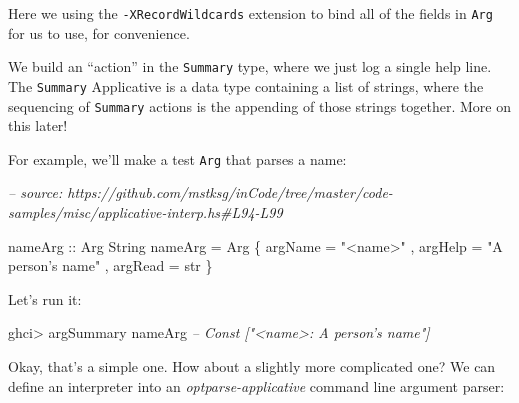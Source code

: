 \documentclass[]{article}
\newenvironment{Shaded}{}{}
\newcommand{\CommentTok}[1]{\textcolor[rgb]{0.38,0.63,0.69}{\textit{#1}}}
\newcommand{\DataTypeTok}[1]{\textcolor[rgb]{0.56,0.13,0.00}{#1}}
\newcommand{\FunctionTok}[1]{\textcolor[rgb]{0.02,0.16,0.49}{#1}}
\newcommand{\NormalTok}[1]{#1}
\newcommand{\OtherTok}[1]{\textcolor[rgb]{0.00,0.44,0.13}{#1}}
\newcommand{\StringTok}[1]{\textcolor[rgb]{0.25,0.44,0.63}{#1}}
\begin{document}
Here we using the \texttt{-XRecordWildcards} extension to bind all of the fields
in \texttt{Arg} for us to use, for convenience.

We build an ``action'' in the \texttt{Summary} type, where we just log a single
help line. The \texttt{Summary} Applicative is a data type containing a list of
strings, where the sequencing of \texttt{Summary} actions is the appending of
those strings together. More on this later!

For example, we'll make a test \texttt{Arg} that parses a name:

\begin{Shaded}
\begin{Highlighting}[]
\CommentTok{-- source: https://github.com/mstksg/inCode/tree/master/code-samples/misc/applicative-interp.hs#L94-L99}

\OtherTok{nameArg ::} \DataTypeTok{Arg} \DataTypeTok{String}
\NormalTok{nameArg }\FunctionTok{=} \DataTypeTok{Arg}
\NormalTok{    \{ argName }\FunctionTok{=} \StringTok{"<name>"}
\NormalTok{    , argHelp }\FunctionTok{=} \StringTok{"A person's name"}
\NormalTok{    , argRead }\FunctionTok{=}\NormalTok{ str}
\NormalTok{    \}}
\end{Highlighting}
\end{Shaded}

Let's run it:

\begin{Shaded}
\begin{Highlighting}[]
\NormalTok{ghci}\FunctionTok{>}\NormalTok{ argSummary nameArg}
\CommentTok{-- Const ["<name>: A person's name"]}
\end{Highlighting}
\end{Shaded}

Okay, that's a simple one. How about a slightly more complicated one? We can
define an interpreter into an \emph{optparse-applicative} command line argument
parser:

\begin{Shaded}
\end{Shaded}
\end{document}
